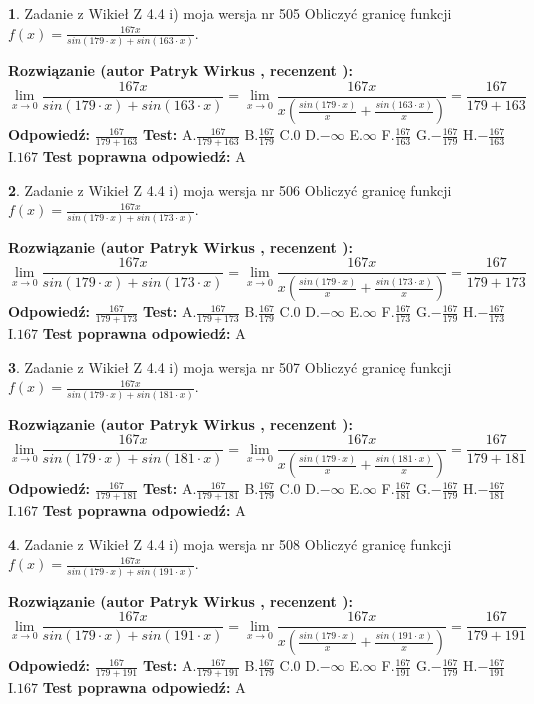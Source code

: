 \documentclass[12pt, a4paper]{article}
\theoremstyle{definition} %
\newtheorem{zad}{}
\newcommand{\zadStart}[1]{\begin{zad}#1\newline}
\newcommand{\zadStop}{\end{zad}}
\newcommand{\rozwStart}[2]{\noindent \textbf{Rozwiązanie (autor #1 , recenzent #2): }\newline}
\newcommand{\rozwStop}{\newline}
\newcommand{\odpStart}{\noindent \textbf{Odpowiedź:}\newline}
\newcommand{\odpStop}{\newline}
\newcommand{\testStart}{\noindent \textbf{Test:}\newline}
\newcommand{\testStop}{\newline}
\newcommand{\kluczStart}{\noindent \textbf{Test poprawna odpowiedź:}\newline}
\newcommand{\kluczStop}{\newline}
\begin{document}
\zadStart{Zadanie z Wikieł Z 4.4 i) moja wersja nr 505}
Obliczyć granicę funkcji $f(x)=\frac{167x}{sin(179\cdot x) +sin(163\cdot x)}$.
\zadStop
\rozwStart{Patryk Wirkus}{}
$$\lim\limits_{x\to 0}\frac{167x}{sin(179\cdot x) +sin(163\cdot x)}=\lim\limits_{x\to 0}\frac{167x}{x(\frac{sin(179\cdot x)}{x}+\frac{sin(163\cdot x)}{x})}=\frac{167}{179+163}$$
\rozwStop
\odpStart
$\frac{167}{179+163}$
\odpStop
\testStart
A.$\frac{167}{179+163}$
B.$\frac{167}{179}$
C.$0$
D.$-\infty$
E.$\infty$
F.$\frac{167}{163}$
G.$-\frac{167}{179}$
H.$-\frac{167}{163}$
I.$167$
\testStop
\kluczStart
A
\kluczStop



\zadStart{Zadanie z Wikieł Z 4.4 i) moja wersja nr 506}
Obliczyć granicę funkcji $f(x)=\frac{167x}{sin(179\cdot x) +sin(173\cdot x)}$.
\zadStop
\rozwStart{Patryk Wirkus}{}
$$\lim\limits_{x\to 0}\frac{167x}{sin(179\cdot x) +sin(173\cdot x)}=\lim\limits_{x\to 0}\frac{167x}{x(\frac{sin(179\cdot x)}{x}+\frac{sin(173\cdot x)}{x})}=\frac{167}{179+173}$$
\rozwStop
\odpStart
$\frac{167}{179+173}$
\odpStop
\testStart
A.$\frac{167}{179+173}$
B.$\frac{167}{179}$
C.$0$
D.$-\infty$
E.$\infty$
F.$\frac{167}{173}$
G.$-\frac{167}{179}$
H.$-\frac{167}{173}$
I.$167$
\testStop
\kluczStart
A
\kluczStop



\zadStart{Zadanie z Wikieł Z 4.4 i) moja wersja nr 507}
Obliczyć granicę funkcji $f(x)=\frac{167x}{sin(179\cdot x) +sin(181\cdot x)}$.
\zadStop
\rozwStart{Patryk Wirkus}{}
$$\lim\limits_{x\to 0}\frac{167x}{sin(179\cdot x) +sin(181\cdot x)}=\lim\limits_{x\to 0}\frac{167x}{x(\frac{sin(179\cdot x)}{x}+\frac{sin(181\cdot x)}{x})}=\frac{167}{179+181}$$
\rozwStop
\odpStart
$\frac{167}{179+181}$
\odpStop
\testStart
A.$\frac{167}{179+181}$
B.$\frac{167}{179}$
C.$0$
D.$-\infty$
E.$\infty$
F.$\frac{167}{181}$
G.$-\frac{167}{179}$
H.$-\frac{167}{181}$
I.$167$
\testStop
\kluczStart
A
\kluczStop



\zadStart{Zadanie z Wikieł Z 4.4 i) moja wersja nr 508}
Obliczyć granicę funkcji $f(x)=\frac{167x}{sin(179\cdot x) +sin(191\cdot x)}$.
\zadStop
\rozwStart{Patryk Wirkus}{}
$$\lim\limits_{x\to 0}\frac{167x}{sin(179\cdot x) +sin(191\cdot x)}=\lim\limits_{x\to 0}\frac{167x}{x(\frac{sin(179\cdot x)}{x}+\frac{sin(191\cdot x)}{x})}=\frac{167}{179+191}$$
\rozwStop
\odpStart
$\frac{167}{179+191}$
\odpStop
\testStart
A.$\frac{167}{179+191}$
B.$\frac{167}{179}$
C.$0$
D.$-\infty$
E.$\infty$
F.$\frac{167}{191}$
G.$-\frac{167}{179}$
H.$-\frac{167}{191}$
I.$167$
\testStop
\kluczStart
A
\kluczStop
\end{document}
